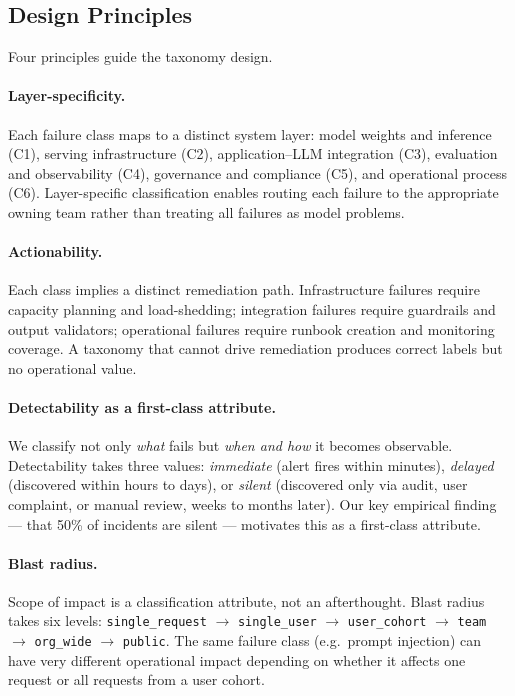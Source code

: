 \documentclass{article}
\begin{document}
\subsection{Design Principles}

Four principles guide the taxonomy design.

\paragraph{Layer-specificity.}
Each failure class maps to a distinct system layer: model weights and inference
(C1), serving infrastructure (C2), application--LLM integration (C3), evaluation
and observability (C4), governance and compliance (C5), and operational process
(C6).  Layer-specific classification enables routing each failure to the
appropriate owning team rather than treating all failures as model problems.

\paragraph{Actionability.}
Each class implies a distinct remediation path.  Infrastructure failures require
capacity planning and load-shedding; integration failures require guardrails and
output validators; operational failures require runbook creation and monitoring
coverage.  A taxonomy that cannot drive remediation produces correct labels but
no operational value.

\paragraph{Detectability as a first-class attribute.}
We classify not only \emph{what} fails but \emph{when and how} it becomes
observable.  Detectability takes three values: \emph{immediate} (alert fires
within minutes), \emph{delayed} (discovered within hours to days), or
\emph{silent} (discovered only via audit, user complaint, or manual review,
weeks to months later).  Our key empirical finding --- that 50\% of incidents
are silent --- motivates this as a first-class attribute.

\paragraph{Blast radius.}
Scope of impact is a classification attribute, not an afterthought.  Blast
radius takes six levels: \texttt{single\_request} $\to$ \texttt{single\_user}
$\to$ \texttt{user\_cohort} $\to$ \texttt{team} $\to$ \texttt{org\_wide}
$\to$ \texttt{public}.  The same failure class (e.g.\ prompt injection) can
have very different operational impact depending on whether it affects one
request or all requests from a user cohort.
\end{document}
